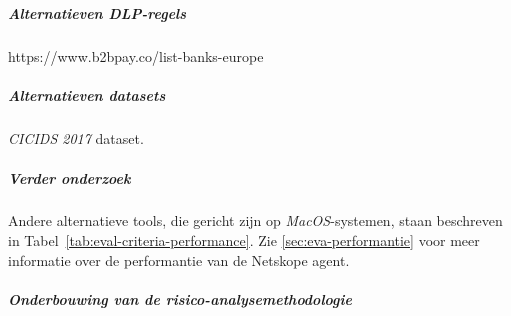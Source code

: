 
\chapter{}%
\label{ch:discussie}


\paragraph{Alternatieven DLP-regels}

https://www.b2bpay.co/list-banks-europe

\paragraph{Alternatieven datasets}

\textit{CICIDS 2017} dataset.

\paragraph{Verder onderzoek}

Andere alternatieve tools, die gericht zijn op \textit{MacOS}-systemen, staan beschreven in Tabel~\ref{tab:eval-criteria-performance}.
Zie \ref{sec:eva-performantie} voor meer informatie over de performantie van de Netskope agent.

\paragraph{Onderbouwing van de risico-analysemethodologie}

\textcite{Zadeh2023} %


